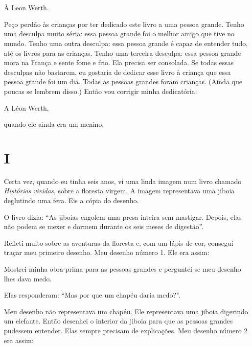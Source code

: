

\chapter*{}

\vspace*{\fill}

\epigraph{}{}{
\begin{flushright}
À Leon Werth.\\
\end{flushright}
Peço perdão às crianças por ter dedicado este livro a uma pessoa grande.
Tenho uma desculpa muito séria: essa pessoa grande foi o melhor amigo
que tive no mundo. Tenho uma outra desculpa: essa pessoa grande é capaz
de entender tudo, até os livros para as crianças. Tenho uma terceira
desculpa: essa pessoa grande mora na França e sente fome e frio. Ela
precisa ser consolada. Se todas essas desculpas não bastarem, eu
gostaria de dedicar esse livro à criança que essa pessoa grande foi um
dia. Todas as pessoas grandes foram crianças. (Ainda que poucas se
lembrem disso.) Então vou corrigir minha dedicatória:
\begin{flushright}
A Léon Werth,

quando ele ainda era um menino.
\end{flushright}
}


\chapter{I}
Certa vez, quando eu tinha seis anos, vi uma linda imagem num livro
chamado \emph{Histórias vividas}, sobre a floresta virgem. A imagem
representava uma jiboia deglutindo uma fera. Eis a cópia do desenho.

O livro dizia: ``As jiboias engolem uma presa inteira sem mastigar.
Depois, elas não podem se mexer e dormem durante os seis meses de
digestão''.

Refleti muito sobre as aventuras da floresta e, com um lápis de cor,
consegui traçar meu primeiro desenho. Meu desenho número 1. Ele era
assim:

Mostrei minha obra-prima para as pessoas grandes e perguntei se meu
desenho lhes dava medo.

Elas responderam: ``Mas por que um chapéu daria medo?''.

Meu desenho não representava um chapéu. Ele representava uma jiboia
digerindo um elefante. Então desenhei o interior da jiboia para que as
pessoas grandes pudessem entender. Elas sempre precisam de explicações.
Meu desenho número 2 era assim:

